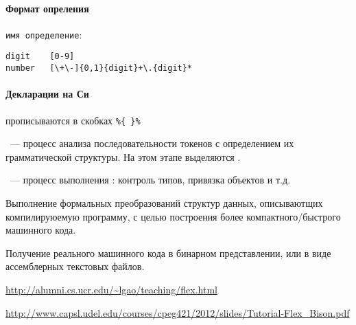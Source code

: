\paragraph{Формат опреления} \verb|имя определение|:
\begin{verbatim}
digit    [0-9]
number   [\+\-]{0,1}{digit}+\.{digit}*
\end{verbatim}

\paragraph{Декларации на Си} прописываются в скобках \verb|%{ }%|







\begin{framed}\noindent
{}\ --- процесс анализа
последовательности токенов с определением их грамматической структуры. На этом
этапе выделяются .
\end{framed}


\begin{framed}\noindent
{}\ --- процесс выполнения
: контроль типов, привязка объектов и т.д. 
\end{framed}


Выполнение формальных преобразований структур данных, описываютщих
компилируюемую программу, с целью построения более компактного/быстрого
машинного кода.


Получение реального машинного кода в бинарном представлении, или в виде
ассемблерных текстовых файлов.

\label{lexlit}

\bigskip

\url{http://alumni.cs.ucr.edu/~lgao/teaching/flex.html}

\url{http://www.capsl.udel.edu/courses/cpeg421/2012/slides/Tutorial-Flex\_Bison.pdf}



\secup
